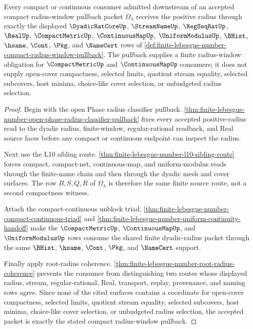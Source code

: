 \begin{theorem}
\label{thm:finite-lebesgue-number-compact-radius-window-pullback}
Every compact or continuous consumer admitted downstream of an accepted compact radius-window pullback packet $\Omega_{\lambda}$ receives the positive radius through exactly the displayed $\DyadicRatCoreUp$, $\StreamNameUp$, $\RegSeqRatUp$, $\RealUp$, $\CompactMetricUp$, $\ContinuousMapUp$, $\UniformModulusUp$, $\BHist$, $\hsame$, $\Cont$, $\Pkg$, and $\NameCert$ rows of \autoref{def:finite-lebesgue-number-compact-radius-window-pullback}. The pullback supplies a finite radius-window obligation for $\CompactMetricUp$ and $\ContinuousMapUp$ consumers; it does not supply open-cover compactness, selected limits, quotient stream equality, selected subcovers, host minima, choice-like cover selection, or unbudgeted radius selection.
\end{theorem}
\begin{proof}
Begin with the open Phase radius classifier pullback. \autoref{thm:finite-lebesgue-number-open-phase-radius-classifier-pullback} fixes every accepted positive-radius read to the dyadic radius, finite-window, regular-rational readback, and Real source faces before any compact or continuous endpoint can inspect the radius.

Next use the L10 sibling route. \autoref{thm:finite-lebesgue-number-l10-sibling-route} forces compact, compact-net, continuous-map, and uniform-modulus reads through the finite-name chain and then through the dyadic mesh and cover surfaces. The row $B,S,Q,R$ of $\Omega_{\lambda}$ is therefore the same finite source route, not a second compactness witness.

Attach the compact-continuous unblock triad. \autoref{thm:finite-lebesgue-number-compact-continuous-triad} and \autoref{thm:finite-lebesgue-number-uniform-continuity-handoff} make the $\CompactMetricUp$, $\ContinuousMapUp$, and $\UniformModulusUp$ rows consume the shared finite dyadic-radius packet through the same $\BHist$, $\hsame$, $\Cont$, $\Pkg$, and $\NameCert$ support.

Finally apply root-radius coherence. \autoref{thm:finite-lebesgue-number-root-radius-coherence} prevents the consumer from distinguishing two routes whose displayed radius, stream, regular-rational, Real, transport, replay, provenance, and naming rows agree. Since none of the cited surfaces contains a coordinate for open-cover compactness, selected limits, quotient stream equality, selected subcovers, host minima, choice-like cover selection, or unbudgeted radius selection, the accepted packet is exactly the stated compact radius-window pullback.
\end{proof}

